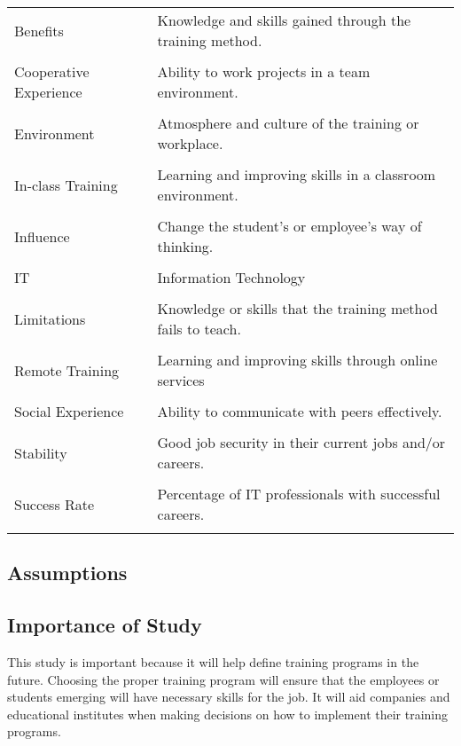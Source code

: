 \documentclass[titlepage]{article}
\begin{document}
\begin{tabularx}{\textwidth}{lX}
Benefits & Knowledge and skills gained through the training method.\\\\
Cooperative Experience & Ability to work projects in a team environment.\\\\
Environment & Atmosphere and culture of the training or workplace.\\\\
In-class Training & Learning and improving skills in a classroom environment.\\\\
Influence & Change the student's or employee's way of thinking.\\\\
IT & Information Technology \\\\
Limitations & Knowledge or skills that the training method fails to teach.\\\\
Remote Training & Learning and improving skills through online services\\\\
Social Experience & Ability to communicate with peers effectively.\\\\
Stability & Good job security in their current jobs and/or careers.\\\\
Success Rate & Percentage of IT professionals with successful careers.\\\\
\end{tabularx}

\subsection{Assumptions}

\subsection{Importance of Study}
This study is important because it will help define training programs in the future.
Choosing the proper training program will ensure that the employees or students emerging
will have necessary skills for the job.  It will aid companies and educational institutes
when making decisions on how to implement their training programs.
\end{document}
